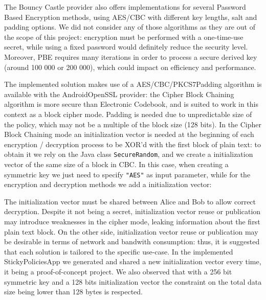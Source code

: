 

The Bouncy Castle provider also offers implementations for several Password Based Encryption methods, using AES/CBC with different key lengths, salt and padding options. We did not consider any of those algorithms as they are out of the scope of this project: encryption must be performed with a one-time-use secret, while using a fixed password would definitely reduce the security level. Moreover, PBE requires many iterations in order to process a secure derived key (around 100 000 or 200 000), which could impact on efficiency and performance.

The implemented solution makes use of a AES/CBC/PKCS7Padding  algorithm is available with the AndroidOpenSSL provider: the Cipher Block Chaining algorithm is more secure than Electronic Codebook, and is suited to work in this context as a block cipher mode. Padding is needed due to unpredictable size of the policy, which may not be a multiple of the block size (128 bits). In the Cipher Block Chaining mode an initialization vector is needed at the beginning of each encryption / decryption process to be XOR'd with the first block of plain text: to obtain it we rely on the Java class \texttt{SecureRandom}, and we create a initialization vector of the same size of a block in CBC. In this case, when creating a symmetric key we just need to specify \texttt{"AES"} as input parameter, while for the encryption and decryption methods we add a initialization vector:



The initialization vector must be shared between Alice and Bob to allow correct decryption. Despite it not being a secret, initialization vector reuse or publication may introduce weaknesses in the cipher mode, leaking information about the first plain text block. On the other side, initialization vector reuse or publication may be desirable in terms of network and bandwith consumption: thus, it is suggested that each solution is tailored to the specific use-case. In the implemented StickyPoliciesApp we generated and shared a new initialization vector every time, it being a proof-of-concept project. We also observed that with a 256 bit symmetric key and a 128 bits initialization vector the constraint on the total data size being lower than 128 bytes is respected.

